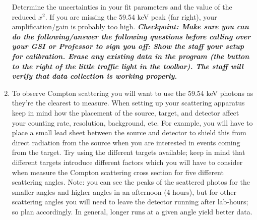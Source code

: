 \documentclass{../lab}
\begin{document}
\begin{enumerate}
	Determine the uncertainties in your fit parameters and the value of the reduced $x^2$. If you are missing the 59.54 keV peak (far right), your amplification/gain is probably too high. \emph{\textbf{Checkpoint: Make sure you can do the following/answer the following questions before calling over your GSI or Professor to sign you off:
	Show the staff your setup for calibration. Erase any existing data in the program (the button to the right of the little traffic light in the toolbar). The staff will verify that data collection is working properly.}}

    \item To observe Compton scattering you will want to use the 59.54 keV photons as they're the clearest to measure. When setting up your scattering apparatus keep in mind how the placement of the source, target, and detector affect your counting rate, resolution, background, etc. For example, you will have to place a small lead sheet between the source and detector to shield this from direct radiation from the source when you are interested in events coming from the target. Try using the different targets available; keep in mind that different targets introduce different factors which you will have to consider when measure the Compton scattering cross section for five different scattering angles. Note: you can see the peaks of the scattered photos for the smaller angles and higher angles in an afternoon (4 hours), but for other scattering angles you will need to leave the detector running after lab-hours; so plan accordingly. In general, longer runs at a given angle yield better data.


\end{enumerate}
\end{document}
